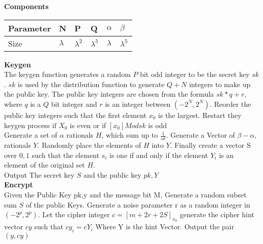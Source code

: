 \documentclass[11pt]{article}
\begin{document}
\begin{center}
\textbf{Components}
\end{center}


\begin{center}
\begin{tabular}{  l | l | l | l | l | l }
\hline
Parameter & N & P & Q & $\alpha$ & $\beta$ \\ \hline
Size &  $\lambda$ & $\lambda ^2$  & $\lambda ^5$ & $\lambda$ & $\lambda ^5$  \\ \hline
\end{tabular}
\end{center}

\textbf{Keygen}\\ 
The keygen function generates a random $P$ bit odd integer to be the secret key $sk$. $sk$ is used by the distribution function to generate $Q + N$ integers to make up the public key. The public key integers are chosen from
the formula $sk * q + r$, where $q$ is a $Q$ bit integer and $r$ is an integer between $(-2^N, 2^N).$ Reorder the public key integers such that the first element $x_0$ is the largest. Restart they keygen process if $X_0$ is even or if $[x_0] Mod sk$ is odd  \\

Generate a set of $\alpha$ rationals $H$, which sum up to $\frac{1}{sk}$. Generate a Vector of $\beta - \alpha$, rationals $Y.$ Randomly place the elements of $H$ into $Y$. Finally create a vector S over $0,1$ such that the element $s_i$ is one if and only if the element $Y_i$ is an element of the original set $H$.\\

Output The secret key $S$ and the public key $pk,Y$\\

\textbf{Encrypt}\\
Given the Public Key pk,y and the message bit M, Generate a random subset sum $S$ of the public Keys. Generate a noise parameter r as a random integer in $(-2^p,2^p)$. Let the cipher integer $c=[m+2r+2S]_{x_0}$ generate the cipher hint vector $cy$ such that $cy_i=cY_i$
Where Y is the hint Vector. Output the pair $(y,cy)$\\
\end{document}
